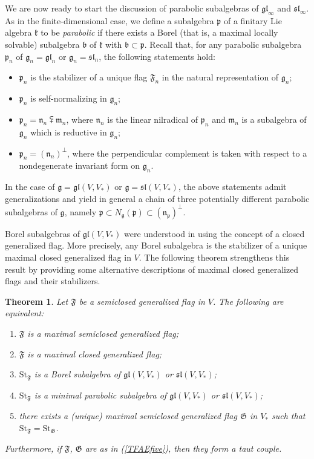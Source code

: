 \documentclass{article}
\newcommand {\St} {\mathrm{St}}
\def\b{\mathfrak {b}}
\def\gl{\mathfrak {gl}}
\def\g{\mathfrak {g}}
\def\m{\mathfrak {m}}
\def\n{\mathfrak {n}}
\def\p{\mathfrak {p}}
\def\sl{\mathfrak{sl}}
\def\k{\mathfrak{k}}
\def\F{\mathfrak{F}}
\def\G{\mathfrak{G}}
\newtheorem{thm}{Theorem}[section]
\begin{document}
We are now ready to start the discussion of parabolic subalgebras of $\gl_\infty$ and $\sl_\infty$.  As in the finite-dimensional case, we define a subalgebra $\p$ of a finitary Lie algebra $\k$ to be \emph{parabolic} if there exists a Borel (that is, a maximal locally solvable) subalgebra $\b$ of $\k$ with $\b \subset \p$.  Recall that, for any parabolic subalgebra $\p_n$ of $\g_n = \gl_n$ or $\g_n = \sl_n$, the following statements hold:
\begin{itemize}
\item $\p_n$ is the stabilizer of a unique flag $\F_n$ in the natural representation of $\g_n$;
\item $\p_n$ is self-normalizing in $\g_n$;
\item $\p_n = \n_n \subsetplus \m_n$, where $\n_n$ is the linear nilradical of $\p_n$ and $\m_n$ is a subalgebra of $\g_n$ which is reductive in $\g_n$;
\item $\p_n = (\n_n)^\perp$, where the perpendicular complement is taken with respect to a nondegenerate invariant form on $\g_n$. 
\end{itemize}

In the case of $\g = \gl(V,V_*)$ or $\g = \sl(V,V_*)$, the above statements admit generalizations and yield in general a chain of three potentially different parabolic subalgebras of $\g$, namely $\p \subset N_\g(\p) \subset (\n_\p)^\perp$.  

Borel subalgebras of $\gl(V,V_*)$ were understood in \cite{DP2} using the concept of a closed generalized flag.  More precisely, any Borel subalgebra is the stabilizer of a unique maximal closed generalized flag in $V$.  The following theorem strengthens this result by providing some alternative descriptions of maximal closed generalized flags and their stabilizers.


\begin{thm} \label{tfae}
Let $\F$ be a semiclosed generalized flag in $V$. The following are equivalent:
\begin{enumerate}
\item \label{TFAEone} $\F$ is a maximal semiclosed generalized flag;
\item \label{TFAEtwo} $\F$ is a maximal closed generalized flag;
\item \label{TFAEthree} $\St_\F$ is a Borel subalgebra of $\gl(V,V_*)$ or $\sl(V,V_*)$;
\item \label{TFAEfour} $\St_\F$ is a minimal parabolic subalgebra of $\gl(V,V_*)$ or $\sl(V,V_*)$;
\item \label{TFAEfive} there exists a (unique) maximal semiclosed generalized flag $\G$ in $V_*$ such that $\St_\F = \St_\G$.
\end{enumerate}
Furthermore, if $\F$, $\G$ are as in (\ref{TFAEfive}), then they form a taut couple.
\end{thm} 
\end{document}

